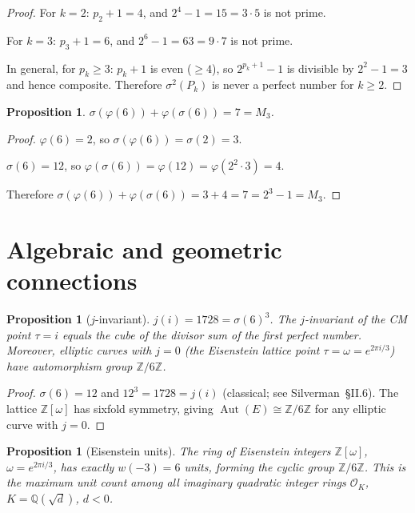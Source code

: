 \documentclass[11pt]{amsart}
\newtheorem{proposition}[theorem]{Proposition}
\theoremstyle{remark}
\begin{document}
\begin{proof}
For $k = 2$: $p_2 + 1 = 4$, and $2^4 - 1 = 15 = 3 \cdot 5$ is not prime.

For $k = 3$: $p_3 + 1 = 6$, and $2^6 - 1 = 63 = 9 \cdot 7$ is not prime.

In general, for $p_k \geq 3$: $p_k + 1$ is even ($\geq 4$),
so $2^{p_k+1} - 1$ is divisible by $2^2 - 1 = 3$ and hence composite.
Therefore $\sigma^2(P_k)$ is never a perfect number for $k \geq 2$.
\end{proof}

\begin{proposition}\label{prop:sigma-phi-bridge}
$\sigma(\varphi(6)) + \varphi(\sigma(6)) = 7 = M_3$.
\end{proposition}

\begin{proof}
$\varphi(6) = 2$, so $\sigma(\varphi(6)) = \sigma(2) = 3$.

$\sigma(6) = 12$, so $\varphi(\sigma(6)) = \varphi(12) = \varphi(2^2 \cdot 3) = 4$.

Therefore $\sigma(\varphi(6)) + \varphi(\sigma(6)) = 3 + 4 = 7 = 2^3 - 1 = M_3$.
\end{proof}

\section{Algebraic and geometric connections}

\begin{proposition}[$j$-invariant]\label{prop:j-invariant}
$j(i) = 1728 = \sigma(6)^3$.
The $j$-invariant of the CM point $\tau = i$ equals the cube
of the divisor sum of the first perfect number.
Moreover, elliptic curves with $j = 0$ (the Eisenstein lattice point
$\tau = \omega = e^{2\pi i/3}$) have automorphism group $\mathbb{Z}/6\mathbb{Z}$.
\end{proposition}

\begin{proof}
$\sigma(6) = 12$ and $12^3 = 1728 = j(i)$ (classical; see Silverman~\S II.6).
The lattice $\mathbb{Z}[\omega]$ has sixfold symmetry,
giving $\operatorname{Aut}(E) \cong \mathbb{Z}/6\mathbb{Z}$
for any elliptic curve with $j = 0$.
\end{proof}

\begin{proposition}[Eisenstein units]\label{prop:eisenstein}
The ring of Eisenstein integers $\mathbb{Z}[\omega]$,
$\omega = e^{2\pi i/3}$, has exactly $w(-3) = 6$ units,
forming the cyclic group $\mathbb{Z}/6\mathbb{Z}$.
This is the maximum unit count among all imaginary quadratic
integer rings $\mathcal{O}_K$, $K = \mathbb{Q}(\sqrt{d})$, $d < 0$.
\end{proposition}
\end{document}
